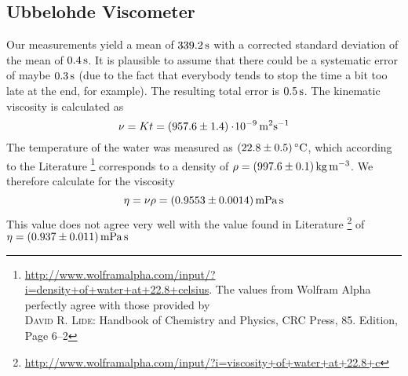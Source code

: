 \subsection{Ubbelohde Viscometer}
Our measurements yield a mean of $\unit[339.2]{s}$ with a corrected standard deviation of the mean of $\unit[0.4]{s}$. It is plausible to assume that there could be a systematic error of maybe $\unit[0.3]{s}$ (due to the fact that everybody tends to stop the time a bit too late at the end, for example). The resulting total error is $\unit[0.5]{s}$. The kinematic viscosity is calculated as
\[
    \nu = K t = \unit[(957.6 \pm 1.4)\e{-9}]{m^2 s^{-1}}
\]
The temperature of the water was measured as $(22.8 \pm 0.5)\C$, which according to the Literature%
\footnote{\url{http://www.wolframalpha.com/input/?i=density+of+water+at+22.8+celsius}. The values from Wolfram Alpha perfectly agree with those provided by \\ \textsc{David R. Lide}: Handbook of Chemistry and Physics, CRC Press, 85. Edition, Page 6--2}
corresponds to a density of $\rho = \unit[(997.6 \pm 0.1)]{kg\,m^{-3}}$. We therefore calculate for the viscosity
\[
    \eta =  \nu \rho = \unit[(0.9553 \pm0.0014)]{mPa\,s}
\]
This value does not agree very well with the value found in Literature%
\footnote{\url{http://www.wolframalpha.com/input/?i=viscosity+of+water+at+22.8+c}}
of $\eta = \unit[(0.937 \pm 0.011)]{mPa\, s}$

